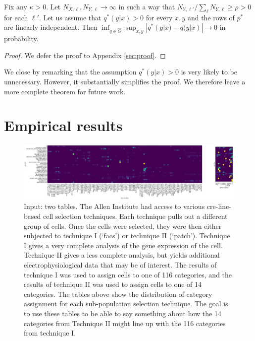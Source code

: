 \vspace{.1in}
\begin{thm}
Fix any $\kappa>0$.  Let $N_{X,\ell},N_{Y,\ell}\rightarrow\infty$ in such a way that $N_{Y,\ell'}/\sum_{\ell}N_{Y,\ell} \geq \rho>0$ for each $\ell'$.  Let us assume that $q^*(y|x)>0$ for every $x,y$ and the rows of $p^*$ are linearly independent.  Then $\inf_{q\in \hat\Theta} \sup_{x,y}|q^*(y|x)-q(y|x)|\rightarrow 0$ in probability.
\end{thm}

\begin{proof}
We defer the proof to Appendix \ref{sec:proof}.
\end{proof}

We close by remarking that the assumption $q^*(y|x)>0$ is very likely to be unnecessary.  However, it substantially simplifies the proof.  We therefore leave a more complete theorem for future work.  

\section{Empirical results}

\begin{figure}
\begin{minipage}[c]{.3\textwidth}
\includegraphics[width=.9\textheight,angle=270]{pics/alleninput}
\end{minipage}
\hfill
\begin{minipage}[l]{.4\textwidth}
\caption{Input: two tables.  The Allen Institute had access to various cre-line-based cell selection techniques.  Each technique pulls out a different group of cells.  Once the cells were selected, they were then either subjected to technique I (`facs') or technique II (`patch').  Technique I gives a very complete analysis of the gene expression of the cell.  Technique II gives a less complete analysis, but yields additional electrophysiological data that may be of interest.  The results of technique I was used to assign cells to one of 116 categories, and the results of technique II was used to assign cells to one of 14 categories.  The tables above show the distribution of category assignment for each sub-population selection technique.  The goal is to use these tables to be able to say something about how the 14 categories from Technique II might line up with the 116 categories from technique I.  \label{fig:alleninput}}
\end{minipage}
\end{figure}

